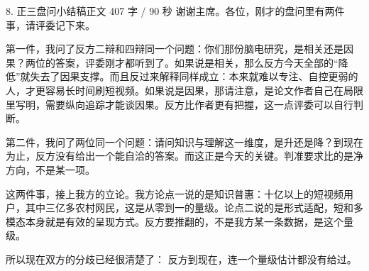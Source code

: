 \documentclass[script,pro]{debate}
\begin{document}
\begin{speech}{8. 正三盘问小结稿}{正文 407 字 / 90 秒}
谢谢主席。各位，刚才的盘问里有两件事，请评委记下来。

第一件，我问了反方二辩和四辩同一个问题：你们那份脑电研究，是相关还是因果？两位的答案，评委刚才都听到了。如果说是相关，那么反方今天全部的“降低”就失去了因果支撑。而且反过来解释同样成立：本来就难以专注、自控更弱的人，才更容易长时间刷短视频。如果说是因果，那请注意，是论文作者自己在局限里写明，需要纵向追踪才能谈因果。反方比作者更有把握，这一点评委可以自行判断。

第二件，我问了两位同一个问题：请问知识与理解这一维度，是升还是降？到现在为止，反方没有给出一个能自洽的答案。而这正是今天的关键。判准要求比的是净方向，不是某一项。

这两件事，接上我方的立论。我方论点一说的是知识普惠：十亿以上的短视频用户，其中三亿多农村网民，这是从零到一的量级。论点二说的是形式适配，短和多模态本身就是有效的呈现方式。反方要推翻的，不是我方某一条数据，是这个量级。

所以现在双方的分歧已经很清楚了： 反方到现在，连一个量级估计都没有给过。

\end{speech}
\end{document}

